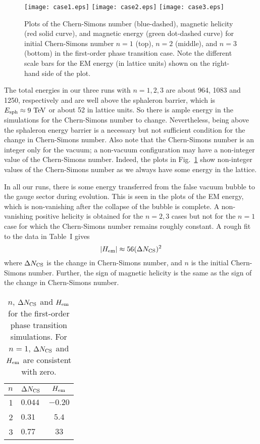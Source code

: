 \documentclass[prd,twocolumn,nofootinbib]{revtex4-1}
\newcommand{\be}{\begin{equation}}
\newcommand{\ee}{\end{equation}}
\begin{document}
\begin{figure}
\texttt{[image: case1.eps]}
\texttt{[image: case2.eps]}
\texttt{[image: case3.eps]}
  \caption{Plots of the Chern-Simons number (blue-dashed),
  magnetic helicity (red solid curve), and magnetic energy (green dot-dashed curve)
  for initial Chern-Simons number $n=1$ (top), $n=2$ (middle), and $n=3$ (bottom)
  in the first-order phase transition case.
	Note the different scale bars for the EM energy (in lattice units)
	shown on the right-hand side of the plot.
	}
\label{case-a-pic}
\end{figure}

The total energies in our three runs with $n=1,2,3$ are about 964, 1083 and 1250, respectively
and are well above the sphaleron barrier, which is $E_{\rm sph} \approx 9~{\rm TeV}$ 
\cite{Manton:1983nd,Klinkhamer:1984di}
or about 52 in lattice units. So there is ample energy in the simulations for 
the Chern-Simons number
to change. Nevertheless, being above the sphaleron energy barrier 
is a necessary but not sufficient condition for the change in Chern-Simons 
number. 
Also note that the Chern-Simons number is an integer 
only for the vacuum; a non-vacuum configuration may have a non-integer value of the Chern-Simons 
number. Indeed, the plots in Fig.~\ref{case-a-pic} 
show non-integer values of the Chern-Simons number as we always
have some energy in the lattice.

In all our runs, there is some energy transferred from the false vacuum bubble to the 
gauge sector during evolution. This is seen in the plots of the EM energy, which is
non-vanishing after the collapse of the bubble is complete. A non-vanishing positive helicity 
is obtained for the $n=2,3$ cases but not for the $n=1$ case for which the Chern-Simons
number remains roughly constant. A rough fit to the data in Table~I gives
\be
| H_{\rm em} | \approx 56 (\Delta N_{\rm CS})^2
\label{hfit}
\ee
where $\Delta N_{\rm CS}$ is the change in Chern-Simons number,
and $n$ is the initial Chern-Simons number.
Further, the sign of magnetic helicity is the same as the sign
of the change in Chern-Simons number.

\begin{table}[H]
\begin{ruledtabular}
\begin{tabular}{ r  l  c }
$n$ & $\Delta N_{\rm CS}$  & $H_{\rm em}$\tabularnewline
\hline 
1 & $0.044$ & $-0.20$\tabularnewline
\hline 
2 & $0.31$  & $5.4$\tabularnewline
\hline 
3 & $0.77$  & $33$\tabularnewline
\end{tabular}
\end{ruledtabular}
\caption{ $n$, $\Delta N_{\rm CS} $ and $H_{\rm em}$ for the first-order phase transition simulations.
For $n=1$, $\Delta N_{\rm CS}$ and $H_{\rm em}$ are consistent with zero.}
\end{table}
\end{document}
